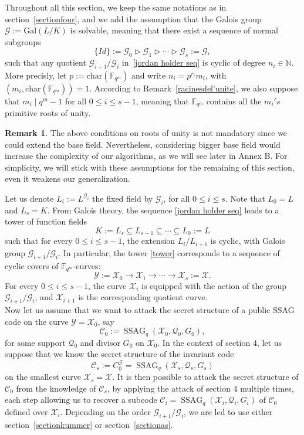\documentclass[10pt]{article}
\theoremstyle{definition}
\newtheorem{rq1}[thm]{Remark}
\theoremstyle{definition}
\theoremstyle{definition}
\newcommand{\C}{\mathcal{C}}
\newcommand{\N}{\mathbb{N}}
\newcommand{\Fqm}{\mathbb{F}_{q^m}}
\newcommand{\su}{\subseteq}
\newcommand{\X}{\mathcal{X}}
\newcommand{\Y}{\mathcal{Y}}
\newcommand{\QR}{\mathcal{Q}}
\newcommand{\G}{\mathcal{G}}
\newcommand{\ssag}{\operatorname{SSAG}}
\begin{document}
Throughout all this section, we keep the same notations as in section~\ref{sectionfour}, and we add the assumption that the Galois group $\G := \mathrm{Gal}(L/K)$ is solvable,   meaning that there exist a sequence of normal subgroups 
\begin{equation} \label{jordan holder seq}
 \{Id\} := \G_0 \triangleright \G_1 \triangleright \cdots \triangleright \G_s := \G, 
\end{equation} 
such that any quotient $\G_{i+1}/\G_i$ in~\eqref{jordan holder seq} is cyclic of degree $n_i \in \N$. 
More precisly, let $p := \mathrm{char}(\Fqm)$ and write $n_i = p^{r_i}m_i$, with $(m_i,\mathrm{char}(\Fqm))=1$. According to Remark~\ref{racinesdel'unite}, we also suppose that $m_i \mid q^m-1$ for all $0\leq i\leq s-1$, meaning that $\Fqm$ contains all the $m_i's$ primitive roots of unity. 

\begin{rq1} \label{base_filed_extension}
The above conditions on roots of unity is not mandatory since we could extend the base field. Nevertheless, considering bigger base field would increase the complexity of our algorithms, as we will see later in Annex B. For simplicity, we will stick with these assumptions for the remaining of this section, even it weakens our generalization.  
\end{rq1}

Let us denote $L_i := L^{\G_i}$ the fixed field by $\G_i$, for all $0 \leq i \leq s$. Note that $L_0=L$ and $L_s=K$. From Galois theory, the sequence \eqref{jordan holder seq} leads to a tower of function fields
\begin{equation} \label{tower}
K := L_s \su L_{s-1} \su \cdots \su L_0 := L
\end{equation}
such that for every $0\leq i\leq s-1$, the extension $L_i/L_{i+1}$ is cyclic, with Galois group $\G_{i+1}/\G_i$. In particular, the tower \eqref{tower} corresponds to a sequence of cyclic covers of $\Fqm$-curves:
\begin{equation} \label{curve tower}
\Y := \X_0 \longrightarrow \X_1 \longrightarrow \cdots \longrightarrow \X_s := \X.
\end{equation}
For every $0 \leq i \leq s-1$, the curve $\X_i$ is equipped with the action of the group $\G_{i+1}/\G_i$, and $\X_{i+1}$ is the corresponding quotient curve. \\
Now let us assume that we want to attack the secret structure of a public SSAG code on the curve $\Y=\X_0$, say
\[\C_0 := \ssag_q(\X_0,\QR_0,G_0),\]
for some support $\QR_0$ and divisor $G_0$ on $\X_0$. In the context of section 4, let us suppose that we know the secret structure of the invariant code 
\[\C_s:= C_0^{\G} = \ssag_q(\X_s,\QR_s,G_s)\]
on the smallest curve $\X_s=\X$. It is then possible to attack the secret structure of $\C_0$ from the knowledge of $\C_s$, by applying the attack of section 4 multiple times, each step allowing us to recover a subcode $\C_i=\ssag_q(\X_i,\QR_i,G_i)$ of $\C_0$ defined over $\X_i$. Depending on the order $\G_{i+1}/\G_i$, we are led to use either section~\ref{sectionkummer} or section~\ref{sectionas}.
\end{document}
